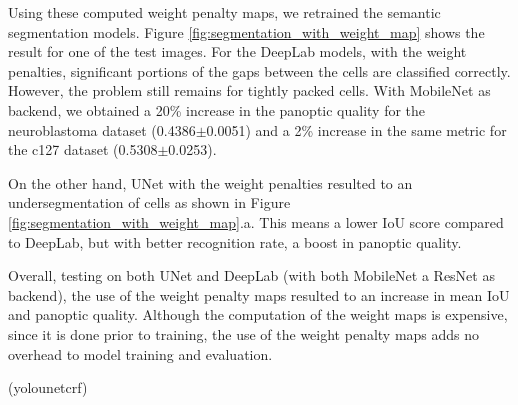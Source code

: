 \documentclass[10pt, journal, compsoc]{IEEEtran}
\begin{document}
Using these computed weight penalty maps, we retrained the semantic segmentation models. Figure \ref{fig:segmentation_with_weight_map} shows the result for one of the test images. For the DeepLab models, with the weight penalties, significant portions of the gaps between the cells are classified correctly. However, the problem still remains for tightly packed cells. With MobileNet as backend, we obtained a 20\% increase in the panoptic quality for the neuroblastoma dataset (0.4386$\pm$0.0051) and a 2\% increase in the same metric for the c127 dataset (0.5308$\pm$0.0253).

On the other hand, UNet with the weight penalties resulted to an undersegmentation of cells as shown in Figure \ref{fig:segmentation_with_weight_map}.a. This means a lower IoU score compared to DeepLab, but with better recognition rate, a boost in panoptic quality.

Overall, testing on both UNet and DeepLab (with both MobileNet a ResNet as backend), the use of the weight penalty maps resulted to an increase in mean IoU and panoptic quality. Although the computation of the weight maps is expensive, since it is done prior to training, the use of the weight penalty maps adds no overhead to model training and evaluation.

(yolounetcrf)
\end{document}
